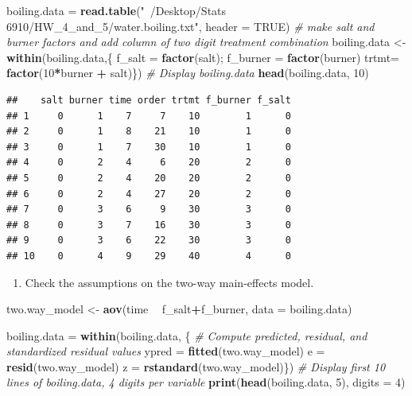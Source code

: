\documentclass[12pt,]{article}
\newenvironment{Shaded}{\begin{snugshade}}{\end{snugshade}}
\newcommand{\KeywordTok}[1]{\textcolor[rgb]{0.13,0.29,0.53}{\textbf{#1}}}
\newcommand{\DataTypeTok}[1]{\textcolor[rgb]{0.13,0.29,0.53}{#1}}
\newcommand{\DecValTok}[1]{\textcolor[rgb]{0.00,0.00,0.81}{#1}}
\newcommand{\StringTok}[1]{\textcolor[rgb]{0.31,0.60,0.02}{#1}}
\newcommand{\CommentTok}[1]{\textcolor[rgb]{0.56,0.35,0.01}{\textit{#1}}}
\newcommand{\OtherTok}[1]{\textcolor[rgb]{0.56,0.35,0.01}{#1}}
\newcommand{\OperatorTok}[1]{\textcolor[rgb]{0.81,0.36,0.00}{\textbf{#1}}}
\newcommand{\NormalTok}[1]{#1}
\providecommand{\tightlist}{%
  \setlength{\itemsep}{0pt}\setlength{\parskip}{0pt}}
\begin{document}
\begin{Shaded}
\begin{Highlighting}[]
\NormalTok{boiling.data =}\StringTok{ }\KeywordTok{read.table}\NormalTok{(}\StringTok{"~/Desktop/Stats 6910/HW_4_and_5/water.boiling.txt"}\NormalTok{, }
                            \DataTypeTok{header =} \OtherTok{TRUE}\NormalTok{)}
\CommentTok{# make salt and burner factors and add column of two digit treatment combination}
\NormalTok{boiling.data <-}\StringTok{ }\KeywordTok{within}\NormalTok{(boiling.data,\{}
\NormalTok{   f_salt =}\StringTok{ }\KeywordTok{factor}\NormalTok{(salt); f_burner =}\StringTok{ }\KeywordTok{factor}\NormalTok{(burner)}
\NormalTok{   trtmt=}\StringTok{ }\KeywordTok{factor}\NormalTok{(}\DecValTok{10}\OperatorTok{*}\NormalTok{burner }\OperatorTok{+}\StringTok{ }\NormalTok{salt)\})}
\CommentTok{# Display boiling.data}
\KeywordTok{head}\NormalTok{(boiling.data, }\DecValTok{10}\NormalTok{)}
\end{Highlighting}
\end{Shaded}

\begin{verbatim}
##    salt burner time order trtmt f_burner f_salt
## 1     0      1    7     7    10        1      0
## 2     0      1    8    21    10        1      0
## 3     0      1    7    30    10        1      0
## 4     0      2    4     6    20        2      0
## 5     0      2    4    20    20        2      0
## 6     0      2    4    27    20        2      0
## 7     0      3    6     9    30        3      0
## 8     0      3    7    16    30        3      0
## 9     0      3    6    22    30        3      0
## 10    0      4    9    29    40        4      0
\end{verbatim}

\begin{enumerate}
\def\labelenumi{(\alph{enumi})}
\tightlist
\item
  Check the assumptions on the two-way main-effects model.
\end{enumerate}

\begin{Shaded}
\begin{Highlighting}[]
\NormalTok{two.way_model <-}\StringTok{ }\KeywordTok{aov}\NormalTok{(time }\OperatorTok{~}\StringTok{ }\NormalTok{f_salt}\OperatorTok{+}\NormalTok{f_burner, }\DataTypeTok{data =}\NormalTok{ boiling.data)}

\NormalTok{boiling.data =}\StringTok{ }\KeywordTok{within}\NormalTok{(boiling.data, \{}
  \CommentTok{# Compute predicted, residual, and standardized residual values}
\NormalTok{  ypred =}\StringTok{ }\KeywordTok{fitted}\NormalTok{(two.way_model)}
\NormalTok{  e =}\StringTok{ }\KeywordTok{resid}\NormalTok{(two.way_model) }
\NormalTok{  z =}\StringTok{ }\KeywordTok{rstandard}\NormalTok{(two.way_model)\})}
\CommentTok{# Display first 10 lines of boiling.data, 4 digits per variable}
\KeywordTok{print}\NormalTok{(}\KeywordTok{head}\NormalTok{(boiling.data, }\DecValTok{5}\NormalTok{), }\DataTypeTok{digits =} \DecValTok{4}\NormalTok{)}
\end{Highlighting}
\end{Shaded}
\end{document}
